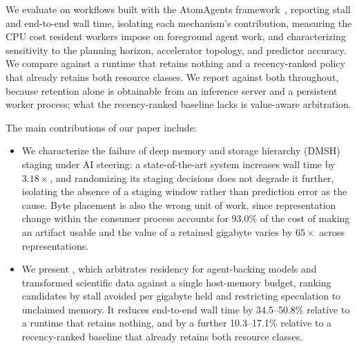 We evaluate \sysname{} on workflows built with the AtomAgents
framework~\cite{atomagents},
reporting stall and end-to-end wall time, isolating each mechanism's
contribution, measuring the CPU cost resident workers impose on foreground
agent work, and characterizing sensitivity to the planning horizon,
accelerator topology, and predictor accuracy. We compare against a runtime
that retains nothing and a recency-ranked policy that already retains both
resource classes. We report against both throughout,
because retention alone is obtainable from an inference server and a
persistent worker process; what the recency-ranked baseline lacks is
value-aware arbitration.

\medskip
\noindent The main contributions of our paper include:

\begin{itemize}

\item We characterize the failure of deep memory and storage hierarchy (DMSH)
staging under AI steering: a state-of-the-art system increases wall time by
$3.18\times$, and randomizing its staging decisions does not degrade it
further, isolating the absence of a staging window rather than prediction
error as the cause. Byte placement is also the wrong unit of work, since
representation change within the consumer process accounts for 93.0\% of the
cost of making an artifact usable and the value of a retained gigabyte varies
by $65\times$ across representations.

\item We present \sysname, which arbitrates residency for agent-backing models
and transformed scientific data against a single host-memory budget, ranking
candidates by stall avoided per gigabyte held and restricting speculation to
unclaimed memory. It reduces end-to-end wall time by 34.5--50.8\% relative to a
runtime that retains nothing, and by a further 10.3--17.1\% relative to a
recency-ranked baseline that already retains both resource classes.

\end{itemize}
